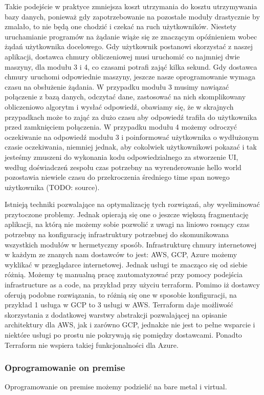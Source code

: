 Takie podejście w praktyce zmniejsza koszt utrzymania do kosztu utrzymywania bazy danych, ponieważ gdy zapotrzebowanie na pozostałe moduły drastycznie by zmalało, to nie będą one chodzić i czekać na ruch użytkowników.
Niestety uruchamianie programów na żądanie wiąże się ze znaczącym opóźnieniem wobec żądań użytkownika docelowego.
Gdy użytkownik postanowi skorzystać z naszej aplikacji, dostawca chmury obliczeniowej musi uruchomić co najmniej dwie maszyny, dla modułu 3 i 4, co czasami potrafi zająć kilka sekund.
Gdy dostawca chmury uruchomi odpowiednie maszyny, jeszcze nasze oprogramowanie wymaga czasu na obsłużenie żądania.
W przypadku modułu 3 musimy nawiązać połączenie z bazą danych, odczytać dane, zastosować na nich skomplikowany obliczeniowo algorytm i wysłać odpowiedź, obawiamy się, że w skrajnych przypadkach może to zająć za dużo czasu aby odpowiedź trafiła do użytkownika przed zamknięciem połączenia.
W przypadku modułu 4 możemy odroczyć oczekiwanie na odpowiedź modułu 3 i poinformować użytkownika o wydłużonym czasie oczekiwania, niemniej jednak, aby cokolwiek użytkownikowi pokazać i tak jesteśmy zmuszeni do wykonania kodu odpowiedzialnego za stworzenie UI, według doświadczeń zespołu czas potrzebny na wyrenderowanie hello world pozostawia niewiele czasu do przekroczenia średniego time span nowego użytkownika (TODO: source).

Istnieją techniki pozwalające na optymalizację tych rozwiązań, aby wyeliminować przytoczone problemy.
Jednak opierają się one o jeszcze większą fragmentację aplikacji, na którą nie możemy sobie pozwolić z uwagi na liniowo rosnący czas potrzebny na konfigurację infrastruktury potrzebnej do skomunikowana wszystkich modułów w hermetyczny sposób.
Infrastrukturę chmury internetowej w każdym ze znanych nam dostawców to jest: AWS, GCP, Azure możemy wyklikać w przeglądarce internetowej.
Jednak usługi te znacząco się od siebie różnią.
Możemy tę manualną pracę zautomatyzować przy pomocy podejścia infrastructure as a code, na przykład przy użyciu terraform.
Pomimo iż dostawcy oferują podobne rozwiązania, to różnią się one w sposobie konfiguracji, na przykład 1 usługa w GCP to 3 usługi w AWS\@.
Terraform daje możliwość skorzystania z dodatkowej warstwy abstrakcji pozwalającej na opisanie architektury dla AWS, jak i zarówno GCP, jednakże nie jest to pełne wsparcie i niektóre usługi po prostu nie pokrywają się pomiędzy dostawcami.
Ponadto Terraform nie wspiera takiej funkcjonalności dla Azure.

\subsubsection{Oprogramowanie on premise}
Oprogramowanie on premise możemy podzielić na bare metal i virtual.

